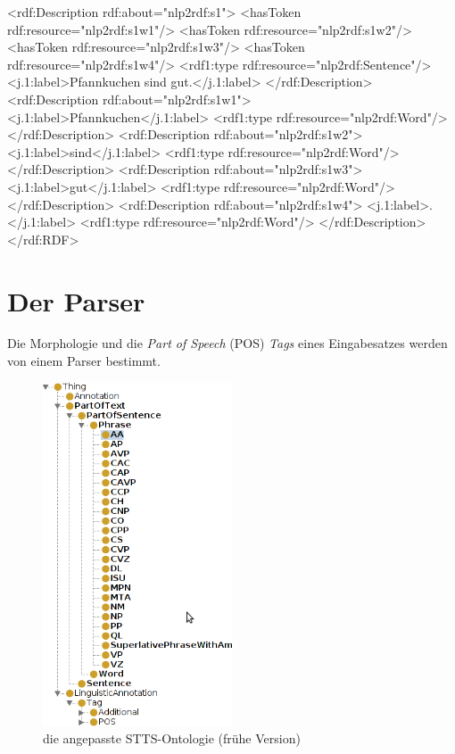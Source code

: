   <rdf:Description rdf:about="nlp2rdf:s1">
    <hasToken rdf:resource="nlp2rdf:s1w1"/>
    <hasToken rdf:resource="nlp2rdf:s1w2"/>
    <hasToken rdf:resource="nlp2rdf:s1w3"/>
    <hasToken rdf:resource="nlp2rdf:s1w4"/>
    <rdf1:type rdf:resource="nlp2rdf:Sentence"/>
    <j.1:label>Pfannkuchen sind gut.</j.1:label>
  </rdf:Description>
 <rdf:Description rdf:about="nlp2rdf:s1w1">
    <j.1:label>Pfannkuchen</j.1:label>
    <rdf1:type rdf:resource="nlp2rdf:Word"/>
  </rdf:Description>
 <rdf:Description rdf:about="nlp2rdf:s1w2">
    <j.1:label>sind</j.1:label>
    <rdf1:type rdf:resource="nlp2rdf:Word"/>
  </rdf:Description>
 <rdf:Description rdf:about="nlp2rdf:s1w3">
    <j.1:label>gut</j.1:label>
    <rdf1:type rdf:resource="nlp2rdf:Word"/>
  </rdf:Description>
 <rdf:Description rdf:about="nlp2rdf:s1w4">
    <j.1:label>.</j.1:label>
    <rdf1:type rdf:resource="nlp2rdf:Word"/>
  </rdf:Description>
</rdf:RDF>
\fi

\section{Der Parser}
Die Morphologie und die \emph{Part of Speech} (POS) \emph{Tags} eines Eingabesatzes werden von einem Parser bestimmt.

\begin{figure}[0.5\textwidth]
    \includegraphics[width=0.5\textwidth]{img/stts_ontology_alpha.png}
    \caption{die angepasste STTS-Ontologie (frühe Version)}
    \label{fig:stts_ontology_alpha}
\end{figure}


